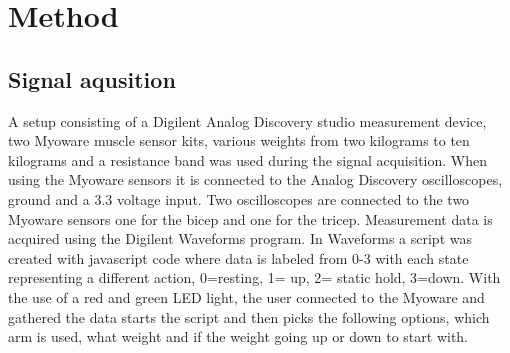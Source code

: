 \section{Method}
\label{section:method}



\subsection{Signal aqusition}
A setup consisting of a Digilent Analog Discovery studio measurement device, two Myoware muscle sensor kits, various weights from two kilograms to ten kilograms and a resistance band was used during the signal acquisition.
When using the Myoware sensors it is connected to the Analog Discovery oscilloscopes, ground and a 3.3 voltage input. Two oscilloscopes are connected to the two Myoware sensors one for the bicep and one for the tricep.
Measurement data is acquired using the Digilent Waveforms program. In Waveforms a script was created with javascript code where data is labeled from 0-3 with each state representing a different action,
0=resting, 1= up, 2= static hold, 3=down. With the use of a red and green LED light, the user connected to the Myoware and gathered the data starts the script and then picks the following options, 
which arm is used, what weight and if the weight going up or down to start with.      


